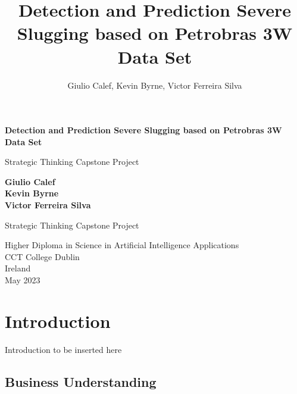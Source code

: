 \documentclass{article}
\begin{document}
\begin{titlepage}
   \begin{center}
       \vspace*{1cm}

       \textbf{Detection and Prediction Severe Slugging based on Petrobras 3W Data Set}

       \vspace{0.5cm}
        Strategic Thinking Capstone Project
            
       \vspace{1.5cm}

       \textbf{Giulio Calef} \\
       \textbf{Kevin Byrne} \\
       \textbf{Victor Ferreira Silva} \\

       \vfill
            
       Strategic Thinking Capstone Project
            
       \vspace{0.8cm}
     
            
       Higher Diploma in Science in Artificial Intelligence Applications\\
       CCT College Dublin\\
       Ireland\\
       May 2023
            
   \end{center}
\end{titlepage}

\title{Detection and Prediction Severe Slugging based on Petrobras 3W Data Set}

\author{Giulio Calef, Kevin Byrne, Victor Ferreira Silva}
\tableofcontents

\maketitle

\section{Introduction}
Introduction to be inserted here

\subsection{Business Understanding}
\end{document}
